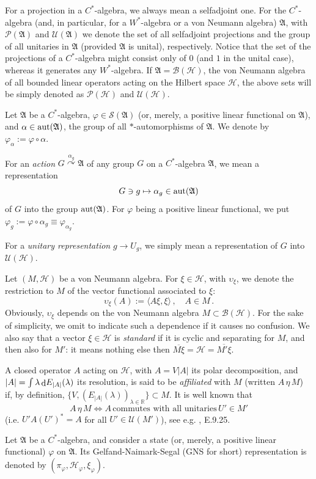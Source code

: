 \documentclass[12pt]{amsart}
\numberwithin{equation}{section}
\def\cb{{\mathcal B}}
\def\ch{{\mathcal H}}
\def\cp{{\mathcal P}}
\def\cs{{\mathcal S}}
\def\cu{{\mathcal U}}
\def\ga{{\mathfrak A}} \def\gpa{{\mathfrak a}}
\def\br{{\mathbb R}}
\def\a{\alpha}
\def\l{\lambda} \def\L{\Lambda}
\def\f{\varphi}\def\ff{\phi} \def\F{\Phi}
\def\di{\mathop{\rm d}\!}
\begin{document}
For a projection in a $C^*$-algebra, we always mean a selfadjoint one. For the $C^*$-algebra (and, in particular, for a $W^*$-algebra or a von Neumann algebra) $\ga$, with $\cp(\ga)$ and $\cu(\ga)$ we denote the set of all selfadjoint projections and the group of all unitaries in $\ga$ (provided $\ga$ is unital), respectively. 
Notice that the set of the projections of a $C^*$-algebra might consist only of $0$ (and $1$ in the unital case), whereas it generates any $W^*$-algebra. If $\ga=\cb(\ch)$, the von Neumann algebra of all bounded linear operators acting on the Hilbert space $\ch$, the above sets will be simply denoted as $\cp(\ch)$ and $\cu(\ch)$.

Let $\ga$ be a $C^*$-algebra, $\f\in\cs(\ga)$ (or, merely, a positive linear functional on $\ga$), and $\a\in{\rm aut}(\ga)$, the group of all $*$-automorphisms of $\ga$. We denote by $\f_\a:=\f\circ\a$.

For an {\it action} $G\stackrel{\a_g}{\curvearrowright}\ga$ of any group $G$ on a $C^*$-algebra $\ga$, we mean a representation
$$
G\ni g\mapsto\a_g\in{\rm aut}(\ga)
$$
of $G$ into the group ${\rm aut}(\ga)$. For $\f$ being a positive linear functional, we put $\f_g:=\f\circ\a_g\equiv\f_{\a_g}$.

For a {\it unitary representation} $g\to U_g$, we simply mean a representation of $G$ into $\cu(\ch)$.

Let $(M,\ch)$ be a von Neumann algebra.
For $\xi\in\ch$, with $\upsilon_\xi$, we denote the restriction to $M$ of the vector functional associated to $\xi$:
$$
\upsilon_\xi(A):=\langle A\xi,\xi\rangle\,,\quad A\in M\,.
$$
Obviously, $\upsilon_\xi$ depends on the von Neumann algebra $M\subset\cb(\ch)$. For the sake of simplicity, we omit to indicate such a dependence if it causes no confusion. We also say that a vector $\xi\in\ch$ is {\it standard} if it is cyclic and separating for $M$, and then also for $M'$: it means nothing else then $\overline{M\xi}=\ch=\overline{M'\xi}$.

A closed operator $A$ acting on $\ch$, with $A=V|A|$ its polar decomposition, and $|A|=\int\l\di E_{|A|}(\l)$ its resolution, is said to be {\it affiliated} with $M$ (written $A\,\eta\,M$) if, by definition, $\big\{V, (E_{|A|}(\l))_{\l\in\br}\big\}\subset M$. It is well known that
$$
A\,\eta\,M\iff A\,\text{commutes with all unitaries}\,U'\in M'
$$
(i.e. $U'A(U')^*=A$ for all $U'\in\cu(M')$), see e.g. \cite{SZ}, E.9.25.

\bigskip

Let $\ga$ be a $C^*$-algebra, and consider a state (or, merely, a positive linear functional) $\f$ on $\ga$. Its Gelfand-Naimark-Segal (GNS for short) representation is denoted by $(\pi_\f,\ch_\f,\xi_\f)$. 
\end{document}
